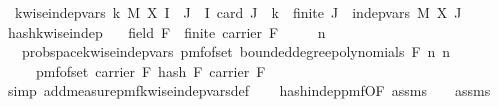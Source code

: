 \begin{isabellebody}
\ \ {\isachardoublequoteopen}k{\isacharunderscore}{\kern0pt}wise{\isacharunderscore}{\kern0pt}indep{\isacharunderscore}{\kern0pt}vars\ k\ M{\isacharprime}{\kern0pt}\ X{\isacharprime}{\kern0pt}\ I\ {\isacharequal}{\kern0pt}\ {\isacharparenleft}{\kern0pt}{\isasymforall}J\ {\isasymsubseteq}\ I{\isachardot}{\kern0pt}\ card\ J\ {\isasymle}\ k\ {\isasymlongrightarrow}\ finite\ J\ {\isasymlongrightarrow}\ indep{\isacharunderscore}{\kern0pt}vars\ M{\isacharprime}{\kern0pt}\ X{\isacharprime}{\kern0pt}\ J{\isacharparenright}{\kern0pt}{\isachardoublequoteclose}\ \isanewline
\isanewline
{}\isamarkupfalse%
\ hash{\isacharunderscore}{\kern0pt}k{\isacharunderscore}{\kern0pt}wise{\isacharunderscore}{\kern0pt}indep{\isacharcolon}{\kern0pt}\isanewline
\ \ \ {\isachardoublequoteopen}field\ F\ {\isasymand}\ finite\ {\isacharparenleft}{\kern0pt}carrier\ F{\isacharparenright}{\kern0pt}{\isachardoublequoteclose}\isanewline
\ \ \ {\isachardoublequoteopen}{}\ {\isasymle}\ n{\isachardoublequoteclose}\isanewline
\ \ \ {\isachardoublequoteopen}prob{\isacharunderscore}{\kern0pt}space{\isachardot}{\kern0pt}k{\isacharunderscore}{\kern0pt}wise{\isacharunderscore}{\kern0pt}indep{\isacharunderscore}{\kern0pt}vars\ {\isacharparenleft}{\kern0pt}pmf{\isacharunderscore}{\kern0pt}of{\isacharunderscore}{\kern0pt}set\ {\isacharparenleft}{\kern0pt}bounded{\isacharunderscore}{\kern0pt}degree{\isacharunderscore}{\kern0pt}polynomials\ F\ n{\isacharparenright}{\kern0pt}{\isacharparenright}{\kern0pt}\ n\isanewline
\ \ \ \ {\isacharparenleft}{\kern0pt}{\isasymlambda}{\isacharunderscore}{\kern0pt}{\isachardot}{\kern0pt}\ pmf{\isacharunderscore}{\kern0pt}of{\isacharunderscore}{\kern0pt}set\ {\isacharparenleft}{\kern0pt}carrier\ F{\isacharparenright}{\kern0pt}{\isacharparenright}{\kern0pt}\ {\isacharparenleft}{\kern0pt}hash\ F{\isacharparenright}{\kern0pt}\ {\isacharparenleft}{\kern0pt}carrier\ F{\isacharparenright}{\kern0pt}{\isachardoublequoteclose}\isanewline
%
\isadelimproof
\ \ %
\endisadelimproof
%
\isatagproof
{}\isamarkupfalse%
\ {\isacharparenleft}{\kern0pt}simp\ add{\isacharcolon}{\kern0pt}measure{\isacharunderscore}{\kern0pt}pmf{\isachardot}{\kern0pt}k{\isacharunderscore}{\kern0pt}wise{\isacharunderscore}{\kern0pt}indep{\isacharunderscore}{\kern0pt}vars{\isacharunderscore}{\kern0pt}def{\isacharparenright}{\kern0pt}\isanewline
\ \ \isamarkupfalse%
\ hash{\isacharunderscore}{\kern0pt}indep{\isacharunderscore}{\kern0pt}pmf{\isacharbrackleft}{\kern0pt}OF\ assms{\isacharparenleft}{\kern0pt}{}{\isacharparenright}{\kern0pt}\ {\isacharunderscore}{\kern0pt}\ {\isacharunderscore}{\kern0pt}\ {\isacharunderscore}{\kern0pt}\ assms{\isacharparenleft}{\kern0pt}{}{\isacharparenright}{\kern0pt}{\isacharbrackright}{\kern0pt}\ \isamarkupfalse%

\end{isabellebody}
